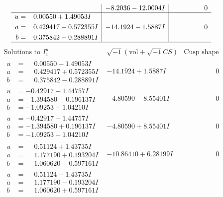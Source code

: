 \documentclass[1p]{elsarticle_modified}
\theoremstyle{definition}
\newcommand{\I}{\sqrt{-1}}
\begin{document}
$$\begin{array}{c|c|c}
 & -8.2036 - 12.0004 I & \phantom{-0.000000 } 0 \\ \hline\begin{aligned}
u &= \phantom{-}0.00550 + 1.49053 I \\
a &= \phantom{-}0.429417 - 0.572355 I \\
b &= \phantom{-}0.375842 + 0.288891 I\end{aligned}
 & -14.1924 - 1.5887 I & \phantom{-0.000000 } 0\\
 \hline 
 \end{array}$$\newpage$$\begin{array}{c|c|c}  
\text{Solutions to }I^u_{1}& \I (\text{vol} + \sqrt{-1}CS) & \text{Cusp shape}\\
 \hline 
\begin{aligned}
u &= \phantom{-}0.00550 - 1.49053 I \\
a &= \phantom{-}0.429417 + 0.572355 I \\
b &= \phantom{-}0.375842 - 0.288891 I\end{aligned}
 & -14.1924 + 1.5887 I & \phantom{-0.000000 } 0 \\ \hline\begin{aligned}
u &= -0.42917 + 1.44757 I \\
a &= -1.394580 - 0.196137 I \\
b &= -1.09253 - 1.04210 I\end{aligned}
 & -4.80590 - 8.55401 I & \phantom{-0.000000 } 0 \\ \hline\begin{aligned}
u &= -0.42917 - 1.44757 I \\
a &= -1.394580 + 0.196137 I \\
b &= -1.09253 + 1.04210 I\end{aligned}
 & -4.80590 + 8.55401 I & \phantom{-0.000000 } 0 \\ \hline\begin{aligned}
u &= \phantom{-}0.51124 + 1.43735 I \\
a &= \phantom{-}1.177190 + 0.193204 I \\
b &= \phantom{-}1.060620 - 0.597161 I\end{aligned}
 & -10.86410 + 6.28199 I & \phantom{-0.000000 } 0 \\ \hline\begin{aligned}
u &= \phantom{-}0.51124 - 1.43735 I \\
a &= \phantom{-}1.177190 - 0.193204 I \\
b &= \phantom{-}1.060620 + 0.597161 I\end{aligned}

\end{array}$$
\end{document}
